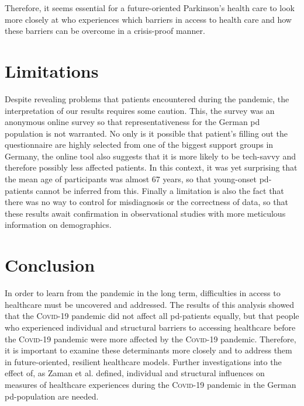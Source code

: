 \documentclass{bmcart}
\begin{document}
Therefore, it seems essential for a future-oriented Parkinson's health care to look more closely at who experiences which barriers in access to health care and how these barriers can be overcome in a crisis-proof manner. 

\section*{Limitations}
Despite revealing problems that patients encountered during the pandemic, the interpretation of our results requires some caution. This, the survey was an anonymous online survey so that representativeness for the German \ac{pd} population is not warranted. No only is it possible that patient's filling out the questionnaire are highly selected from one of the biggest support groups in Germany, the online tool also suggests that it is more likely to be tech-savvy and therefore possibly less affected patients. In this context, it was yet surprising that the mean age of participants was almost 67 years, so that young-onset \ac{pd}-patients cannot be inferred from this. Finally a limitation is also the fact that there was no way to control for misdiagnosis or the correctness of data, so that these results await confirmation in observational studies with more meticulous information on demographics.


\section*{Conclusion}
In order to learn from the pandemic in the long term, difficulties in access to healthcare must be uncovered and addressed. The results of this analysis showed that the \textsc{Covid}-19 pandemic did not affect all \ac{pd}-patients equally, but that people who experienced individual and structural barriers to accessing healthcare before the \textsc{Covid}-19 pandemic were more affected by the \textsc{Covid}-19 pandemic. Therefore, it is important to examine these determinants more closely and to address them in future-oriented, resilient healthcare models. Further investigations into the effect of, as Zaman et al. defined, individual and structural influences on  measures of healthcare experiences during the \textsc{Covid}-19 pandemic in the German \ac{pd}-population are needed.


\end{document}

